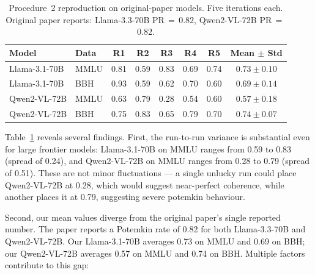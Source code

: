\documentclass[sigconf,authordraft]{acmart}
\begin{document}
\begin{table}[t]
\centering
\small
\setlength{\tabcolsep}{4pt}
\renewcommand{\arraystretch}{1.15}
\begin{tabular}{ll ccccc c}
\toprule
\textbf{Model} & \textbf{Data} & \textbf{R1} & \textbf{R2} & \textbf{R3} & \textbf{R4} & \textbf{R5} & \textbf{Mean $\pm$ Std} \\
\midrule
Llama-3.1-70B & MMLU & 0.81 & 0.59 & 0.83 & 0.69 & 0.74 & $0.73 \pm 0.10$ \\
Llama-3.1-70B & BBH  & 0.93 & 0.59 & 0.62 & 0.70 & 0.60 & $0.69 \pm 0.14$ \\
\rowcolor{gray!10}
Qwen2-VL-72B  & MMLU & 0.63 & 0.79 & 0.28 & 0.54 & 0.60 & $0.57 \pm 0.18$ \\
\rowcolor{gray!10}
Qwen2-VL-72B  & BBH  & 0.75 & 0.83 & 0.65 & 0.79 & 0.70 & $0.74 \pm 0.07$ \\
\bottomrule
\end{tabular}
\caption{Procedure~2 reproduction on original-paper models. Five iterations each. Original paper reports: Llama-3.3-70B PR\,$=$\,0.82, Qwen2-VL-72B PR\,$=$\,0.82.}
\label{tab:original-repro}
\end{table}

Table~\ref{tab:original-repro} reveals several findings. First, the run-to-run variance is substantial even for large frontier models: Llama-3.1-70B on MMLU ranges from 0.59 to 0.83 (spread of 0.24), and Qwen2-VL-72B on MMLU ranges from 0.28 to 0.79 (spread of 0.51). These are not minor fluctuations --- a single unlucky run could place Qwen2-VL-72B at 0.28, which would suggest near-perfect coherence, while another places it at 0.79, suggesting severe potemkin behaviour.

Second, our mean values diverge from the original paper's single reported number. The paper reports a Potemkin rate of 0.82 for both Llama-3.3-70B and Qwen2-VL-72B. Our Llama-3.1-70B averages 0.73 on MMLU and 0.69 on BBH; our Qwen2-VL-72B averages 0.57 on MMLU and 0.74 on BBH. Multiple factors contribute to this gap:
\end{document}
